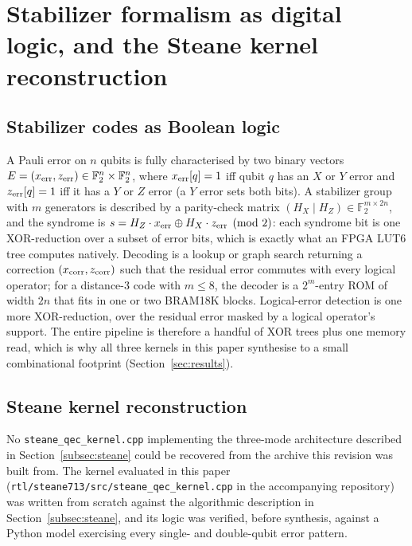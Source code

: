 \section{Stabilizer formalism as digital logic, and the Steane kernel reconstruction}\label{app:reconstruction}

\subsection{Stabilizer codes as Boolean logic}\label{app:formalism}

A Pauli error on \(n\) qubits is fully characterised by two binary vectors \(E=(x_{\rm err},z_{\rm err})\in\mathbb{F}_2^n\times\mathbb{F}_2^n\), where \(x_{\rm err}[q]=1\) iff qubit \(q\) has an \(X\) or \(Y\) error and \(z_{\rm err}[q]=1\) iff it has a \(Y\) or \(Z\) error (a \(Y\) error sets both bits). A stabilizer group with \(m\) generators is described by a parity-check matrix \((H_X\mid H_Z)\in\mathbb{F}_2^{m\times2n}\), and the syndrome is \(s=H_Z\cdot x_{\rm err}\oplus H_X\cdot z_{\rm err}\pmod2\): each syndrome bit is one XOR-reduction over a subset of error bits, which is exactly what an FPGA LUT6 tree computes natively. Decoding is a lookup or graph search returning a correction \((x_{\rm corr},z_{\rm corr})\) such that the residual error commutes with every logical operator; for a distance-3 code with \(m\le8\), the decoder is a \(2^m\)-entry ROM of width \(2n\) that fits in one or two BRAM18K blocks. Logical-error detection is one more XOR-reduction, over the residual error masked by a logical operator's support. The entire pipeline is therefore a handful of XOR trees plus one memory read, which is why all three kernels in this paper synthesise to a small combinational footprint (Section~\ref{sec:results}).

\subsection{Steane kernel reconstruction}\label{app:steane-recon}

No \texttt{steane\_qec\_kernel.cpp} implementing the three-mode architecture described in Section~\ref{subsec:steane} could be recovered from the archive this revision was built from. The kernel evaluated in this paper (\texttt{rtl/steane713/src/steane\_qec\_kernel.cpp} in the accompanying repository) was written from scratch against the algorithmic description in Section~\ref{subsec:steane}, and its logic was verified, before synthesis, against a Python model exercising every single- and double-qubit error pattern.

